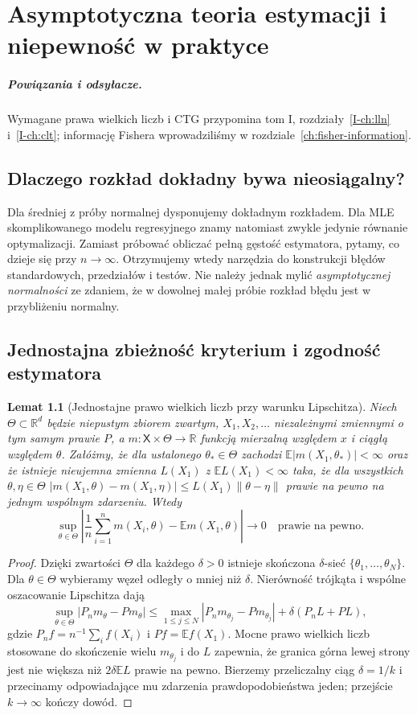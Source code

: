 \documentclass[11pt,a4paper,oneside]{report}
\numberwithin{equation}{chapter}
\theoremstyle{plain}
\newtheorem{lemat}[twierdzenie]{Lemat}
\theoremstyle{definition}
\theoremstyle{remark}
\newcommand{\R}{\mathbb R}
\newcommand{\E}{\mathbb E}
\begin{document}
\chapter{Asymptotyczna teoria estymacji i niepewność w praktyce}
\label{ch:asymptotic-estimation}
\paragraph{Powiązania i odsyłacze.} Wymagane prawa wielkich liczb i CTG przypomina tom I, rozdziały~\ref{I-ch:lln} i~\ref{I-ch:clt}; informację Fishera wprowadziliśmy w rozdziale~\ref{ch:fisher-information}.


\section{Dlaczego rozkład dokładny bywa nieosiągalny?}
Dla średniej z próby normalnej dysponujemy dokładnym rozkładem.
Dla MLE skomplikowanego modelu regresyjnego znamy natomiast zwykle
jedynie równanie optymalizacji. Zamiast próbować obliczać pełną
gęstość estymatora, pytamy, co dzieje się przy $n\to\infty$.
Otrzymujemy wtedy narzędzia do konstrukcji błędów standardowych,
przedziałów i testów. Nie należy jednak mylić \emph{asymptotycznej
normalności} ze zdaniem, że w dowolnej małej próbie rozkład błędu
jest w przybliżeniu normalny.

\section{Jednostajna zbieżność kryterium i zgodność estymatora}
\begin{lemat}[Jednostajne prawo wielkich liczb przy warunku Lipschitza]
\label{lem:uniform-lln}
Niech $\Theta\subset\R^d$ będzie niepustym zbiorem zwartym,
$X_1,X_2,\ldots$ niezależnymi zmiennymi o tym samym prawie $P$,
a $m:\mathsf X\times\Theta\to\R$ funkcją mierzalną względem $x$
i ciągłą względem $\theta$. Załóżmy, że dla ustalonego
$\theta_*\in\Theta$ zachodzi $\E|m(X_1,\theta_*)|<\infty$
oraz że istnieje nieujemna zmienna $L(X_1)$ z $\E L(X_1)<\infty$
taka, że dla wszystkich $\theta,\eta\in\Theta$
$|m(X_1,\theta)-m(X_1,\eta)|\le L(X_1)\|\theta-\eta\|$
prawie na pewno na jednym wspólnym zdarzeniu. Wtedy
\[
\sup_{\theta\in\Theta}\left|\frac1n\sum_{i=1}^n
m(X_i,\theta)-\E m(X_1,\theta)\right|
\longrightarrow0\quad\text{prawie na pewno}.
\]
\end{lemat}
\begin{proof}
Dzięki zwartości $\Theta$ dla każdego $\delta>0$ istnieje
skończona $\delta$-sieć $\{\theta_1,\ldots,\theta_N\}$.
Dla $\theta\in\Theta$ wybieramy węzeł odległy o mniej niż
$\delta$. Nierówność trójkąta i wspólne oszacowanie Lipschitza
dają
\[
\sup_{\theta\in\Theta}|P_nm_\theta-Pm_\theta|
\le\max_{1\le j\le N}|P_nm_{\theta_j}-Pm_{\theta_j}|
+\delta(P_nL+PL),
\]
gdzie $P_nf=n^{-1}\sum_i f(X_i)$ i $Pf=\E f(X_1)$.
Mocne prawo wielkich liczb stosowane do skończenie wielu $m_{\theta_j}$
i do $L$ zapewnia, że granica górna lewej strony jest nie większa
niż $2\delta\E L$ prawie na pewno. Bierzemy przeliczalny
ciąg $\delta=1/k$ i przecinamy odpowiadające mu zdarzenia
prawdopodobieństwa jeden; przejście $k\to\infty$ kończy dowód.
\end{proof}
\end{document}
